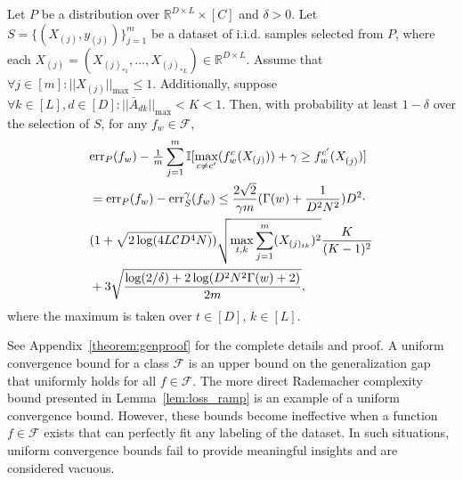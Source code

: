  \begin{theorem}\label{theorem:genbound}
Let $P$ be a distribution over $\mathbb{R}^{D \times L} \times [C]$ and $\delta > 0$. Let $S = \{( X^{}_{(j)},y_{(j)})\}^{m}_{j=1}$ be a dataset of i.i.d. samples selected from $P$, where each \(X_{(j)} = (X_{(j)_{*1}}, \ldots, X_{(j)_{*L}}) \in \mathbb{R}^{D \times L}\). Assume that $\forall j \in [m]: ||X_{(j)}||_{\max} \leq 1$. Additionally, suppose $\forall k \in [L], d \in [D]:||\bar{A}^{}_{dk}||_{\max} < K < 1$. Then, with probability at least $1-\delta$ over the selection of $S$, for any $f_w \in \mathcal{F}$, 
{\small
\begin{equation*}
\begin{aligned}
&\textnormal{err}_P(f_w) - {\textstyle\frac{1}{m}}\sum^{m}_{j=1}\mathbb{I}[\max_{c \neq c'}(f^c_w( X_{(j)})) + \gamma \geq f^{c'}_w( X^{}_{(j)})] \\& = \textnormal{err}_P(f_w) - \textnormal{err}^\gamma_S(f_w) \leq \frac{2\sqrt{2}}{\gamma m} ({\Gamma(w) } +{\frac{1}{D^2N^2}}) D^{2} \cdot \\& (1 + \sqrt{2\log (4L \mathcal{C} D^4 N)}) \sqrt{\max_{t, k} \sum_{j=1}^m (X_{(j)_{tk}})^2} \frac{K}{(K-1)^2} \\&+ 3\sqrt{\frac{\log(2/\delta)+2\log({D^2N^2\Gamma(w) }+2)}{2m}},
\end{aligned}
\end{equation*}
}
where the maximum is taken over \(t \in [D]\),  \(k \in [L]\). 
\end{theorem} 
See Appendix~\ref{theorem:genproof} for the complete details and proof. A uniform convergence bound for a class $\mathcal{F}$ is an upper bound on the generalization gap that uniformly holds for all $f \in \mathcal{F}$. The more direct Rademacher complexity bound presented in  Lemma~\ref{lem:loss_ramp} 
is an example of a uniform convergence bound. However, these bounds become ineffective when a function $f \in \mathcal{F}$ exists that can perfectly fit any labeling of the dataset. In such situations, uniform convergence bounds fail to provide meaningful insights and are considered vacuous.

